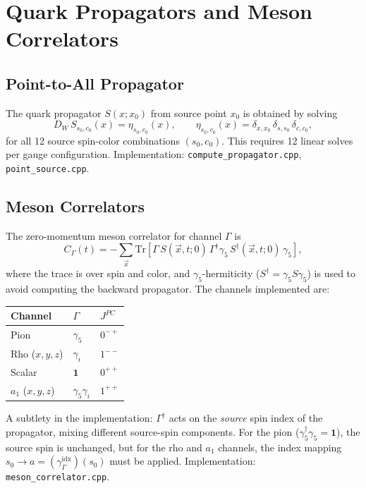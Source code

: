\documentclass[12pt]{article}
\newcommand{\Tr}{\mathrm{Tr}}
\newcommand{\code}[1]{\texttt{#1}}
\begin{document}
\section{Quark Propagators and Meson Correlators}
\label{sec:spectroscopy}

\subsection{Point-to-All Propagator}

The quark propagator $S(x; x_0)$ from source point $x_0$ is obtained by solving
\begin{equation}
D_W \, S_{s_0, c_0}(x) = \eta_{s_0, c_0}(x), \qquad \eta_{s_0, c_0}(x) = \delta_{x, x_0} \, \delta_{s, s_0} \, \delta_{c, c_0},
\end{equation}
for all 12 source spin-color combinations $(s_0, c_0)$. This requires 12 linear solves per gauge configuration. Implementation: \code{compute\_propagator.cpp}, \code{point\_source.cpp}.

\subsection{Meson Correlators}

The zero-momentum meson correlator for channel $\Gamma$ is
\begin{equation}
\label{eq:meson_corr}
C_\Gamma(t) = -\sum_{\vec{x}} \Tr\!\left[\Gamma \, S(\vec{x}, t; 0) \, \Gamma^\dagger \gamma_5 \, S^\dagger(\vec{x}, t; 0) \, \gamma_5\right],
\end{equation}
where the trace is over spin and color, and $\gamma_5$-hermiticity ($S^\dagger = \gamma_5 S \gamma_5$) is used to avoid computing the backward propagator. The channels implemented are:
\begin{center}
\begin{tabular}{lll}
\toprule
Channel & $\Gamma$ & $J^{PC}$ \\
\midrule
Pion & $\gamma_5$ & $0^{-+}$ \\
Rho ($x,y,z$) & $\gamma_i$ & $1^{--}$ \\
Scalar & $\mathbf{1}$ & $0^{++}$ \\
$a_1$ ($x,y,z$) & $\gamma_5 \gamma_i$ & $1^{++}$ \\
\bottomrule
\end{tabular}
\end{center}
A subtlety in the implementation: $\Gamma^\dagger$ acts on the \textit{source} spin index of the propagator, mixing different source-spin components. For the pion ($\gamma_5^\dagger \gamma_5 = \mathbf{1}$), the source spin is unchanged, but for the rho and $a_1$ channels, the index mapping $s_0 \to a = (\gamma_\Gamma^{\mathrm{idx}})(s_0)$ must be applied. Implementation: \code{meson\_correlator.cpp}.
\end{document}
